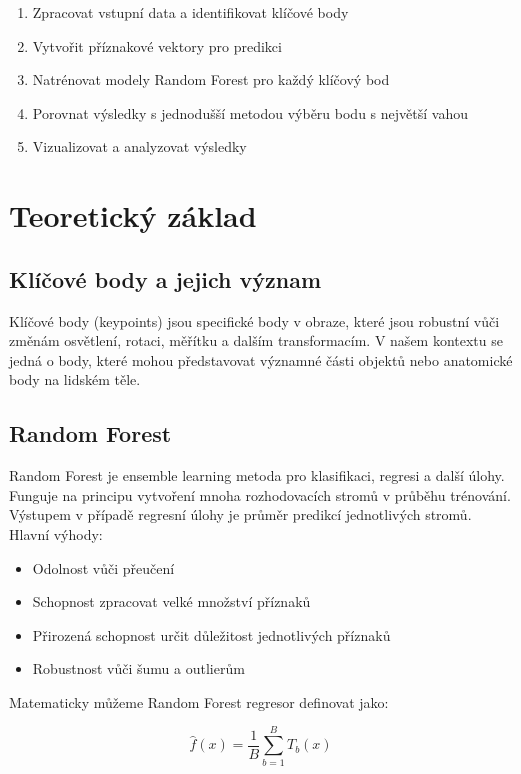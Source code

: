 \documentclass[a4paper,12pt]{article}
\begin{document}
\begin{enumerate}
    \item Zpracovat vstupní data a identifikovat klíčové body
    \item Vytvořit příznakové vektory pro predikci
    \item Natrénovat modely Random Forest pro každý klíčový bod
    \item Porovnat výsledky s jednodušší metodou výběru bodu s největší vahou
    \item Vizualizovat a analyzovat výsledky
\end{enumerate}

\section{Teoretický základ}
\label{sec:theory}

\subsection{Klíčové body a jejich význam}
Klíčové body (keypoints) jsou specifické body v obraze, které jsou robustní vůči změnám osvětlení, rotaci, měřítku a dalším transformacím. V našem kontextu se jedná o body, které mohou představovat významné části objektů nebo anatomické body na lidském těle.

\subsection{Random Forest}
Random Forest je ensemble learning metoda pro klasifikaci, regresi a další úlohy. Funguje na principu vytvoření mnoha rozhodovacích stromů v průběhu trénování. Výstupem v případě regresní úlohy je průměr predikcí jednotlivých stromů. Hlavní výhody:

\begin{itemize}
    \item Odolnost vůči přeučení
    \item Schopnost zpracovat velké množství příznaků
    \item Přirozená schopnost určit důležitost jednotlivých příznaků
    \item Robustnost vůči šumu a outlierům
\end{itemize}

Matematicky můžeme Random Forest regresor definovat jako:

\begin{equation}
\hat{f}(x) = \frac{1}{B}\sum_{b=1}^{B}T_b(x)
\end{equation}
\end{document}
